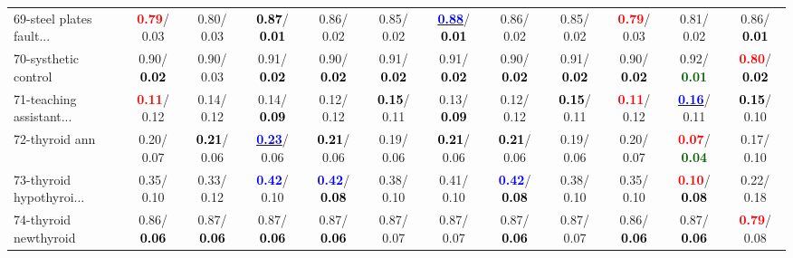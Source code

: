 \begin{table}[h]
\begin{center}
{\begin{tabular}{lc|c|c|c|c|c|c|c|c|c|c}
69-steel plates fault... & \textcolor{red}{\textbf{  0.79}}/  0.03 &   0.80/  0.03 & \textcolor{black}{\textbf{  0.87}}/\textcolor{black}{\textbf{  0.01}} &   0.86/  0.02 &   0.85/  0.02 & \underline{\textcolor{blue}{\textbf{  0.88}}}/\textcolor{black}{\textbf{  0.01}} &   0.86/  0.02 &   0.85/  0.02 & \textcolor{red}{\textbf{  0.79}}/  0.03 &   0.81/  0.02 &   0.86/\textcolor{black}{\textbf{  0.01}} \\
70-systhetic control &   0.90/\textcolor{black}{\textbf{  0.02}} &   0.90/  0.03 &   0.91/\textcolor{black}{\textbf{  0.02}} &   0.90/\textcolor{black}{\textbf{  0.02}} &   0.91/\textcolor{black}{\textbf{  0.02}} &   0.91/\textcolor{black}{\textbf{  0.02}} &   0.90/\textcolor{black}{\textbf{  0.02}} &   0.91/\textcolor{black}{\textbf{  0.02}} &   0.90/\textcolor{black}{\textbf{  0.02}} &   0.92/\textcolor{darkgreen}{\textbf{  0.01}} & \textcolor{red}{\textbf{  0.80}}/\textcolor{black}{\textbf{  0.02}} \\
71-teaching assistant... & \textcolor{red}{\textbf{  0.11}}/  0.12 &   0.14/  0.12 &   0.14/\textcolor{black}{\textbf{  0.09}} &   0.12/  0.12 & \textcolor{black}{\textbf{  0.15}}/  0.11 &   0.13/\textcolor{black}{\textbf{  0.09}} &   0.12/  0.12 & \textcolor{black}{\textbf{  0.15}}/  0.11 & \textcolor{red}{\textbf{  0.11}}/  0.12 & \underline{\textcolor{blue}{\textbf{  0.16}}}/  0.11 & \textcolor{black}{\textbf{  0.15}}/  0.10 \\ \hline
72-thyroid ann &   0.20/  0.07 & \textcolor{black}{\textbf{  0.21}}/  0.06 & \underline{\textcolor{blue}{\textbf{  0.23}}}/  0.06 & \textcolor{black}{\textbf{  0.21}}/  0.06 &   0.19/  0.06 & \textcolor{black}{\textbf{  0.21}}/  0.06 & \textcolor{black}{\textbf{  0.21}}/  0.06 &   0.19/  0.06 &   0.20/  0.07 & \textcolor{red}{\textbf{  0.07}}/\textcolor{darkgreen}{\textbf{  0.04}} &   0.17/  0.10 \\
73-thyroid hypothyroi... &   0.35/  0.10 &   0.33/  0.12 & \textcolor{blue}{\textbf{  0.42}}/  0.10 & \textcolor{blue}{\textbf{  0.42}}/\textcolor{black}{\textbf{  0.08}} &   0.38/  0.10 &   0.41/  0.10 & \textcolor{blue}{\textbf{  0.42}}/\textcolor{black}{\textbf{  0.08}} &   0.38/  0.10 &   0.35/  0.10 & \textcolor{red}{\textbf{  0.10}}/\textcolor{black}{\textbf{  0.08}} &   0.22/  0.18 \\
74-thyroid newthyroid &   0.86/\textcolor{black}{\textbf{  0.06}} &   0.87/\textcolor{black}{\textbf{  0.06}} &   0.87/\textcolor{black}{\textbf{  0.06}} &   0.87/\textcolor{black}{\textbf{  0.06}} &   0.87/  0.07 &   0.87/  0.07 &   0.87/\textcolor{black}{\textbf{  0.06}} &   0.87/  0.07 &   0.86/\textcolor{black}{\textbf{  0.06}} &   0.87/\textcolor{black}{\textbf{  0.06}} & \textcolor{red}{\textbf{  0.79}}/  0.08 \\

\end{tabular}}
\end{center}
\end{table}
